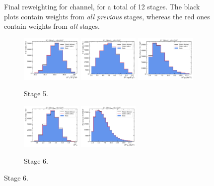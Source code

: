 \begin{figure}[htb]
    \caption{
        Final reweighting for \Dstar channel, for a total of 12 stages.
        The black plots contain weights from \emph{all previous} stages,
        whereas the red ones contain weights from \emph{all} stages.
    }
    \label{fig:final-rwt-dst}
\end{figure}

\begin{figure}[htb]\ContinuedFloat
    \begin{subfigure}{\textwidth}
        \centering
        \includegraphics[width=0.32\textwidth]{./figs-mc-correction/reweighting-final/plot_step5-Dst_iso-d0_comp.pdf}
        \includegraphics[width=0.32\textwidth]{./figs-mc-correction/reweighting-final/plot_step5-Dst_iso-d0_log_ip_chi2.pdf}
        \includegraphics[width=0.32\textwidth]{./figs-mc-correction/reweighting-final/plot_step5-Dst_iso-d0_pt.pdf}
        \caption{Stage 5.}
    \end{subfigure}

    \begin{subfigure}{\textwidth}
        \centering
        \includegraphics[width=0.32\textwidth]{./figs-mc-correction/reweighting-final/plot_step6-Dst_iso-d0_eta.pdf}
        \includegraphics[width=0.32\textwidth]{./figs-mc-correction/reweighting-final/plot_step6-Dst_iso-d0_pt.pdf}
        \caption{Stage 6.}
    \end{subfigure}


\end{figure}
